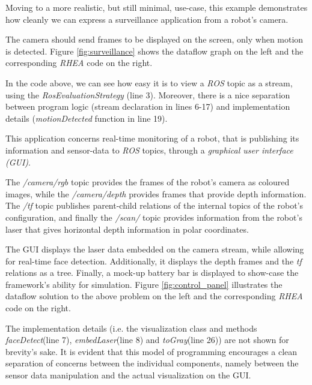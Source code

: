 \documentclass{dithesis}
\begin{document}

Moving to a more realistic, but still minimal, use-case, this example demonstrates how cleanly we can express a surveillance application from a robot's camera.

The camera should send frames to be displayed on the screen, only when motion is detected. Figure \ref{fig:surveillance} shows the dataflow graph on the left and the corresponding \textit{RHEA} code on the right.


In the code above, we can see how easy it is to view a \textit{ROS} topic as a stream, using the \textit{RosEvaluationStrategy} (line 3). Moreover, there is a nice separation between program logic (stream declaration in lines 6-17) and implementation details (\textit{motionDetected} function in line 19).


This application concerns real-time monitoring of a robot, that is publishing its information and sensor-data to \textit{ROS} topics, through a \textit{graphical user interface (GUI)}.

The \textit{/camera/rgb} topic provides the frames of the robot's camera as coloured images, while the \textit{/camera/depth} provides frames that provide depth information. The \textit{/tf} topic publishes parent-child relations of the internal topics of the robot's configuration, and finally the \textit{/scan/} topic provides information from the robot's laser that gives horizontal depth information in polar coordinates.

The GUI displays the laser data embedded on the camera stream, while allowing for real-time face detection. Additionally, it displays the depth frames and the \textit{tf} relations as a tree. Finally, a mock-up battery bar is displayed to show-case the framework's ability for simulation. Figure \ref{fig:control_panel} illustrates the dataflow solution to the above problem on the left and the corresponding \textit{RHEA} code on the right.


The implementation details (i.e. the visualization class and methods \textit{faceDetect}(line 7), \textit{embedLaser}(line 8) and \textit{toGray}(line 26)) are not shown for brevity's sake. It is evident that this model of programming encourages a clean separation of concerns between the individual components, namely between the sensor data manipulation and the actual visualization on the GUI. 
\end{document}
